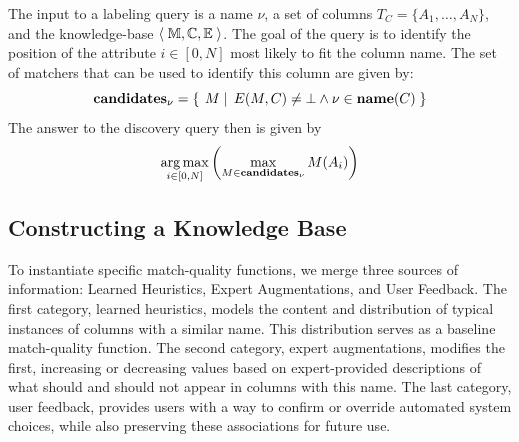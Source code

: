 The input to a labeling query is a name $\nu$, a set of columns $T_C = \{A_1, \ldots, A_N\}$, and the knowledge-base $\left<\;{\mathbb M, \mathbb C, \mathbb E}\;\right>$. 
The goal of the query is to identify the position of the attribute $i \in [0,N]$ most likely to fit the column name.
The set of matchers that can be used to identify this column are given by:
$$\textbf{candidates}_\nu = \left\{\left.\;{M}\;\right|\;{E(M, C) \neq \bot \wedge \nu \in \textbf{name}(C)}\;\right\}$$
The answer to the discovery query then is given by
$$\operatorname*{arg\,max}_{i \in [0,N]} \left( \max_{M \in \textbf{candidates}_\nu} M(A_i)\right)$$

\subsection{Constructing a Knowledge Base}
To instantiate specific match-quality functions, we merge three sources of information: Learned Heuristics, Expert Augmentations, and User Feedback. 
The first category, learned heuristics, models the content and distribution of typical instances of columns with a similar name.
This distribution serves as a baseline match-quality function.
The second category, expert augmentations, modifies the first, increasing or decreasing values based on expert-provided descriptions of what should and should not appear in columns with this name.
The last category, user feedback, provides users with a way to confirm or override automated system choices, while also preserving these associations for future use.

